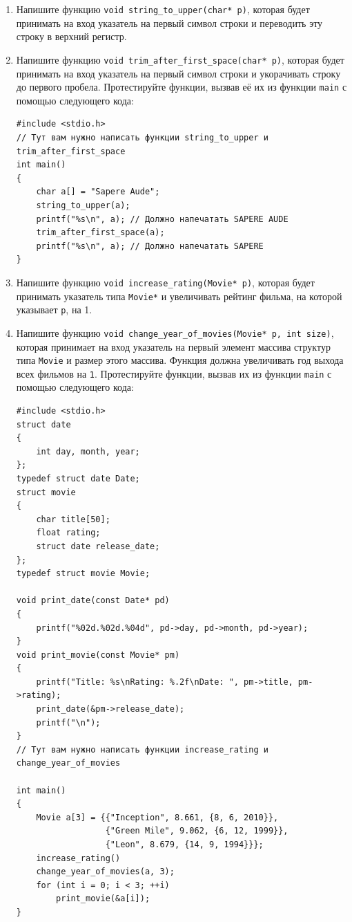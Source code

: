 \documentclass{article}
\begin{document}
\begin{enumerate}
\begin{lstlisting}
int main() 
{
    int a[5] = {10, 20, 30, 40, 50};
    inc_array(a, 5); 
    
    for (int i = 0; i < 5; ++i)
        printf("%i ", a[i]); 
    // Цикл должен напечатать 11 21 31 41 51
}
\end{lstlisting}
\item Напишите функцию \texttt{void string\_to\_upper(char* p)}, которая будет принимать на вход указатель на первый символ строки и переводить эту строку в верхний регистр.

\item Напишите функцию \texttt{void trim\_after\_first\_space(char* p)}, которая будет принимать на вход указатель на первый символ строки и укорачивать строку до первого пробела. Протестируйте функции, вызвав её их из функции \texttt{main} с помощью следующего кода:
\begin{lstlisting}
#include <stdio.h>
// Тут вам нужно написать функции string_to_upper и trim_after_first_space
int main() 
{
    char a[] = "Sapere Aude";
    string_to_upper(a);
    printf("%s\n", a); // Должно напечатать SAPERE AUDE
    trim_after_first_space(a);
    printf("%s\n", a); // Должно напечатать SAPERE
}
\end{lstlisting}

\item Напишите функцию \texttt{void increase\_rating(Movie* p)}, которая будет принимать указатель типа \texttt{Movie*} и увеличивать рейтинг фильма, на которой указывает \texttt{p}, на 1.

\newpage
\item Напишите функцию \texttt{void change\_year\_of\_movies(Movie* p, int size)}, которая принимает на вход указатель на первый элемент массива структур типа \texttt{Movie} и размер этого массива. Функция должна увеличивать год выхода всех фильмов на \texttt{1}. Протестируйте функции, вызвав их из функции \texttt{main} с помощью следующего кода:

\begin{lstlisting}
#include <stdio.h>
struct date 
{
    int day, month, year;
};
typedef struct date Date;
struct movie 
{
    char title[50];
    float rating;
    struct date release_date;
};
typedef struct movie Movie;

void print_date(const Date* pd) 
{
    printf("%02d.%02d.%04d", pd->day, pd->month, pd->year);
}
void print_movie(const Movie* pm) 
{
    printf("Title: %s\nRating: %.2f\nDate: ", pm->title, pm->rating);
    print_date(&pm->release_date);
    printf("\n");
}
// Тут вам нужно написать функции increase_rating и change_year_of_movies

int main() 
{
    Movie a[3] = {{"Inception", 8.661, {8, 6, 2010}}, 
                  {"Green Mile", 9.062, {6, 12, 1999}}, 
                  {"Leon", 8.679, {14, 9, 1994}}};
    increase_rating()
    change_year_of_movies(a, 3);
    for (int i = 0; i < 3; ++i)
        print_movie(&a[i]);
}
\end{lstlisting}

\end{enumerate}
\end{document}
